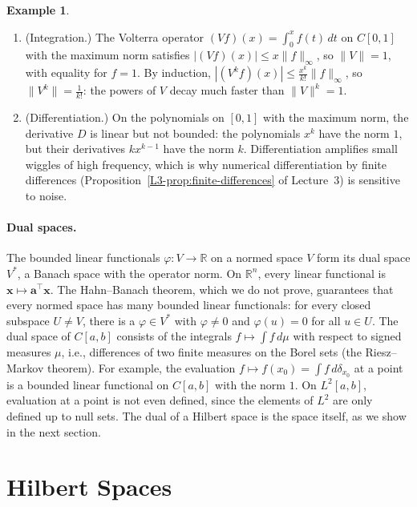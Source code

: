 \documentclass[11pt]{article}
\newcommand{\norm}[1]{\lVert #1 \rVert}
\theoremstyle{definition}
\newtheorem{example}[definition]{Example}
\theoremstyle{plain}
\theoremstyle{remark}
\begin{document}
\begin{example}\label{ex:operators}
    \begin{enumerate}
        \item (Integration.) The Volterra operator $(Vf)(x) = \int_0^x f(t)\, dt$ on $C[0, 1]$ with the maximum norm satisfies $|(Vf)(x)| \leq x\norm{f}_\infty$, so $\norm{V} = 1$, with equality for $f = 1$. By induction, $|(V^kf)(x)| \leq \frac{x^k}{k!}\norm{f}_\infty$, so $\norm{V^k} = \frac{1}{k!}$: the powers of $V$ decay much faster than $\norm{V}^k = 1$.
        \item (Differentiation.) On the polynomials on $[0, 1]$ with the maximum norm, the derivative $D$ is linear but not bounded: the polynomials $x^k$ have the norm $1$, but their derivatives $kx^{k-1}$ have the norm $k$. Differentiation amplifies small wiggles of high frequency, which is why numerical differentiation by finite differences (Proposition~\ref{L3-prop:finite-differences} of Lecture~3) is sensitive to noise.
    \end{enumerate}
\end{example}

\paragraph{Dual spaces.} The bounded linear functionals $\varphi: V \to \mathbb{R}$ on a normed space $V$ form its dual space $V^*$, a Banach space with the operator norm. On $\mathbb{R}^n$, every linear functional is $\mathbf{x} \mapsto \mathbf{a}^\top\mathbf{x}$. The Hahn--Banach theorem, which we do not prove, guarantees that every normed space has many bounded linear functionals: for every closed subspace $U \neq V$, there is a $\varphi \in V^*$ with $\varphi \neq 0$ and $\varphi(u) = 0$ for all $u \in U$. The dual space of $C[a, b]$ consists of the integrals $f \mapsto \int f\, d\mu$ with respect to signed measures $\mu$, i.e., differences of two finite measures on the Borel sets (the Riesz--Markov theorem). For example, the evaluation $f \mapsto f(x_0) = \int f\, d\delta_{x_0}$ at a point is a bounded linear functional on $C[a, b]$ with the norm $1$. On $L^2[a, b]$, evaluation at a point is not even defined, since the elements of $L^2$ are only defined up to null sets. The dual of a Hilbert space is the space itself, as we show in the next section.

\section{Hilbert Spaces}\label{sec:hilbert}
\end{document}
